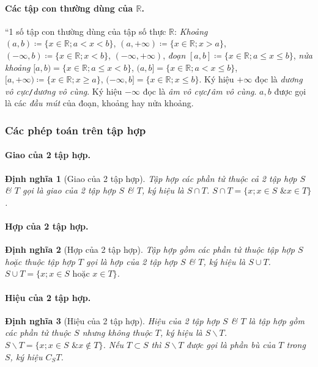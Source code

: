 \documentclass{article}
\numberwithin{equation}{section}
\newtheorem{definition}{Định nghĩa}[section]
\begin{document}
\paragraph{Các tập con thường dùng của $\mathbb{R}$.} ``1 số tập con thường dùng của tập số thực $\mathbb{R}$: \textit{Khoảng} $(a,b)\coloneqq\{x\in\mathbb{R};a < x < b\}$, $(a,+\infty)\coloneqq\{x\in\mathbb{R};x > a\}$, $(-\infty,b)\coloneqq\{x\in\mathbb{R};x < b\}$, $(-\infty,+\infty)$, \textit{đoạn} $[a,b]\coloneqq\{x\in\mathbb{R};a\le x\le b\}$, \textit{nửa khoảng} $[a,b) = \{x\in\mathbb{R};a\le x < b\}$, $(a,b] = \{x\in\mathbb{R};a < x\le b\}$, $[a,+\infty)\coloneqq\{x\in\mathbb{R};x\ge a\}$, $(-\infty,b] = \{x\in\mathbb{R};x\le b\}$. Ký hiệu $+\infty$ đọc là \textit{dương vô cực}\texttt{/}\textit{dương vô cùng}. Ký hiệu $-\infty$ đọc là \textit{âm vô cực}\texttt{/}\textit{âm vô cùng}. $a,b$ được gọi là các \textit{đầu mút} của đoạn, khoảng hay nửa khoảng.

\subsubsection{Các phép toán trên tập hợp}

\paragraph{Giao của 2 tập hợp.}
\begin{definition}[Giao của 2 tập hợp]
	Tập hợp các phần tử thuộc cả 2 tập hợp $S$ \& $T$ gọi là \emph{giao của 2 tập hợp} $S$ \& $T$, ký hiệu là $S\cap T$. $S\cap T = \{x;x\in S\mbox{ \& } x\in T\}$.
\end{definition}

\paragraph{Hợp của 2 tập hợp.}
\begin{definition}[Hợp của 2 tập hợp]
	Tập hợp gồm các phần tử thuộc tập hợp $S$ hoặc thuộc tập hợp $T$ gọi là \emph{hợp của 2 tập hợp} $S$ \& $T$, ký hiệu là $S\cup T$. $S\cup T = \{x;x\in S\mbox{ hoặc } x\in T\}$.
\end{definition}

\paragraph{Hiệu của 2 tập hợp.}
\begin{definition}[Hiệu của 2 tập hợp]
	\emph{Hiệu} của 2 tập hợp $S$ \& $T$ là tập hợp gồm các phần tử thuộc $S$ nhưng không thuộc $T$, ký hiệu là $S\backslash T$. $S\backslash T = \{x;x\in S\mbox{ \& } x\notin T\}$. Nếu $T\subset S$ thì $S\backslash T$ được gọi là \emph{phần bù} của $T$ trong $S$, ký hiệu $C_ST$.
\end{definition}
\end{document}
